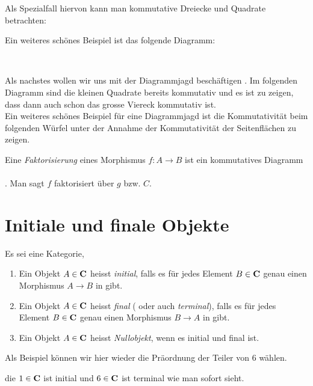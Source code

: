 \documentclass{article}
\begin{document}
\begin{bsp}[Fundamentalgruppoid]
\begin{defi}
		Als Spezialfall hiervon kann man kommutative Dreiecke und Quadrate betrachten:\\
 		 
			
		\end{defi}
			 
		Ein weiteres sch\"ones Beispiel ist das folgende Diagramm:
		\begin{bsp} \\
		
		\end{bsp}
		Als nachstes wollen wir uns mit der Diagrammjagd besch\"aftigen \cite[Beispiel 2.4.7]{Bra}.
		Im folgenden Diagramm sind die kleinen Quadrate bereits kommutativ und es ist zu zeigen, dass dann auch schon das grosse Viereck kommutativ ist. \\
		
		
		Ein weiteres sch\"ones Beispiel f\"ur eine Diagrammjagd ist  die Kommutativit\"at beim folgenden W\"urfel \cite[Quellcode]{tikzcd} unter der Annahme der Kommutativit\"at der Seitenfl\"achen zu zeigen. \\
		

	\begin{defi}[Faktorisierung]
	 \cite[Definition 2.4.8]{Bra}
	Eine \emph{Faktorisierung} eines Morphismus \( f:A \to B \) ist ein kommutatives Diagramm \\
		 \\
	. Man sagt $f$ faktorisiert \"uber $g$ bzw. $ C $.
	\end{defi}
\newpage
\section{Initiale und finale Objekte}
\begin{defi}
 \cite[Definition 2.5.1]{Bra}
	Es sei \CatC eine Kategorie,
	\begin{enumerate}
		\item	 Ein Objekt \( A \in \mathbf{C} \) heisst \emph{initial}, 
		falls es f\"ur jedes Element \( B \in \mathbf{C} \) genau einen Morphismus \(A \to B \) in \CatC gibt.
		\item	 Ein Objekt \( A \in \mathbf{C} \) heisst \emph{final} ( oder auch \emph{terminal}), 
		falls es f\"ur jedes Element \( B \in \mathbf{C} \) genau einen Morphismus \(B \to A \) in \CatC gibt.
		\item	Ein Objekt \( A \in \mathbf{C} \) heisst \emph{Nullobjekt}, wenn es initial und final ist.
	\end{enumerate}
\end{defi}
	Als Beispiel k\"onnen wir hier wieder die Pr\"aordnung der Teiler von 6 w\"ahlen.
	\begin{bsp}
	
	die \( 1 \in \mathbf{C} \) ist initial und  \(6 \in \mathbf{C} \) ist terminal wie man sofort sieht.
	\end{bsp}
	

\end{bsp}
\end{document}
